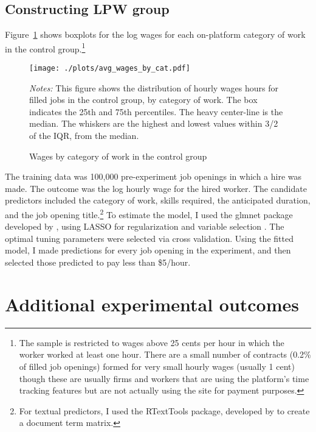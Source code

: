 \documentclass[AER]{AEA}
\begin{document}
\subsection{Constructing LPW group} \label{sec:wages_by_category}

Figure~\ref{fig:wages_by_category} shows boxplots for the log wages for each on-platform category of work in the control group.\footnote{
  The sample is restricted to wages above 25 cents per hour in which the worker worked at least one hour. 
  There are a small number of contracts (0.2\% of filled job openings) formed for very small hourly wages (usually 1 cent) though these are usually firms and workers that are using the platform's time tracking features but are not actually using the site for payment purposes.
}  


\begin{figure}
\centering 
\caption{Wages by category of work in the control group} \label{fig:wages_by_category} 
\texttt{[image: ./plots/avg\_wages\_by\_cat.pdf]} 
\begin{minipage}{0.95\linewidth}
{\footnotesize
\emph{Notes:} 
 This figure shows the distribution of hourly wages hours for filled jobs in the control group, by category of work. 
 The box indicates the 25th and 75th percentiles. 
 The heavy center-line is the median. 
 The whiskers are the highest and lowest values within 3/2 of the IQR, from the median. 
}
\end{minipage} 
\end{figure} 


The training data was 100,000 pre-experiment job openings in which a hire was made.
The outcome was the log hourly wage for the hired worker. 
The candidate predictors included the category of work, skills required, the anticipated duration, and the job opening title.\footnote{
 For textual predictors, I used the RTextTools package, developed by \cite{jurka2012rtexttools} to create a document term matrix.
}
To estimate the model, I used the glmnet package developed by \cite{friedman2009glmnet}, using LASSO for regularization and variable selection \citep{tibshirani1996regression}.
The optimal tuning parameters were selected via cross validation. 
Using the fitted model, I made predictions for every job opening in the experiment, and then selected those predicted to pay less than \$5/hour.


\section{Additional experimental outcomes}
\end{document}
